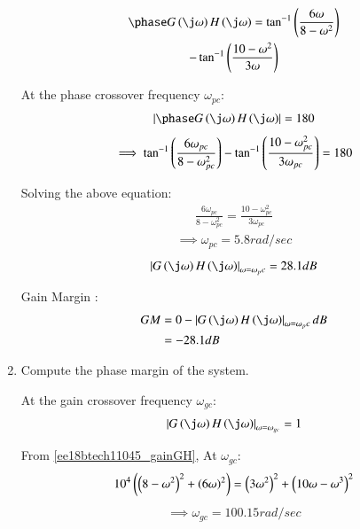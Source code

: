 \begin{enumerate}[label=\thesubsection.\arabic*.,ref=\thesubsection.\theenumi]
\begin{multline}
        \phase G\brak{\j\omega}H\brak{\j\omega} = \tan^{-1}\brak{\frac{6\omega}{8 - \omega^2}} \\ - \tan^{-1}\brak{\frac{10 - \omega^2}{3\omega}}
    \label{ee18btech11045_phaseGH}
\end{multline}

At the phase crossover frequency $\omega_{pc}$:
\begin{align}
    \abs{\phase G\brak{\j\omega}H\brak{\j\omega}} = 180
\end{align}
\begin{align}
    \implies \tan^{-1}\left(\frac{6\omega_{pc}}{8 - \omega_{pc}^2}\right) - \tan^{-1}\left(\frac{10-\omega_{pc}^2}{3\omega_{pc}}\right) = 180
\end{align}

Solving the above equation:
\begin{align}
    \frac{6\omega_{pc}}{8 - \omega_{pc}^2} = \frac{10-\omega_{pc}^2}{3\omega_{pc}}
\end{align}
\begin{align}
    \implies \omega_{pc} = 5.8 rad/sec
\end{align}
\begin{align}
    \abs{G\brak{\j\omega}H\brak{\j\omega}}_{\omega=\omega_pc} = 28.1 dB
\end{align}

Gain Margin  :
\begin{align}
    GM &= 0 - \abs{G\brak{\j\omega}H\brak{\j\omega}}_{\omega=\omega_pc} dB
    \\&= -28.1 dB
\end{align}


\item Compute the phase margin of the system.

\solution

At the gain crossover frequency $\omega_{gc}$:
\begin{align}
    \abs{G\brak{\j\omega}H\brak{\j\omega}}_{\omega=\omega_{gc}} = 1
\end{align}

From \eqref{ee18btech11045_gainGH}, At $\omega_{gc}$:
\begin{align}
    10^4\left(\left(8-\omega^2\right)^2 + \left(6\omega\right)^2\right)=
    \left(3\omega^2\right)^2 + \left(10\omega - \omega^3\right)^2
\end{align}
\begin{align}
    \implies \omega_{gc} = 100.15 rad/sec
\end{align}


\end{enumerate}
